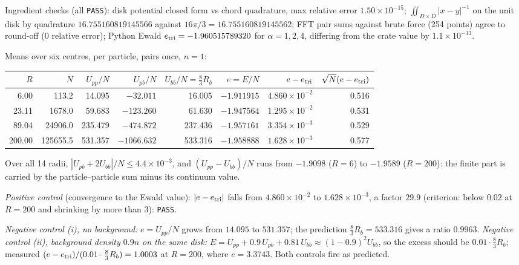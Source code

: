 \begin{numbox}[: three divergent terms, one finite sum ($s=1$, Tier X)]
Ingredient checks (all \texttt{PASS}): disk potential closed form vs chord quadrature, max relative error
$1.50\times10^{-15}$; $\iint_{D\times D}|x-y|^{-1}$ on the unit disk by quadrature $16.755160819145566$ against
$16\pi/3=16.755160819145562$; FFT pair sums against brute force (254 points) agree to round-off ($0$ relative error);
Python Ewald $e_{\rm tri}=-1.960515789320$ for $\alpha=1,2,4$, differing from the crate value by $1.1\times10^{-13}$.

Means over six centres, per particle, pairs once, $n=1$:
\begin{center}\footnotesize\setlength{\tabcolsep}{4pt}
\begin{tabular}{@{}rrrrrrrr@{}}
\toprule
$R$ & $N$ & $U_{pp}/N$ & $U_{pb}/N$ & $U_{bb}/N=\frac83R_b$ & $e=E/N$ & $e-e_{\rm tri}$ & $\sqrt N(e-e_{\rm tri})$\\
\midrule
6.00 & 113.2 & 14.095 & $-32.011$ & 16.005 & $-1.911915$ & $4.860\times10^{-2}$ & 0.516\\
23.11 & 1678.0 & 59.683 & $-123.260$ & 61.630 & $-1.947564$ & $1.295\times10^{-2}$ & 0.531\\
89.04 & 24906.0 & 235.479 & $-474.872$ & 237.436 & $-1.957161$ & $3.354\times10^{-3}$ & 0.529\\
200.00 & 125655.5 & 531.357 & $-1066.632$ & 533.316 & $-1.958888$ & $1.628\times10^{-3}$ & 0.577\\
\bottomrule
\end{tabular}
\end{center}
Over all 14 radii, $|U_{pb}+2U_{bb}|/N\le4.4\times10^{-3}$, and $(U_{pp}-U_{bb})/N$ runs from $-1.9098$ ($R=6$) to
$-1.9589$ ($R=200$): the finite part is carried by the particle--particle sum minus its continuum value.

\emph{Positive control} (convergence to the Ewald value): $|e-e_{\rm tri}|$ falls from $4.860\times10^{-2}$ to
$1.628\times10^{-3}$, a factor $29.9$ (criterion: below $0.02$ at $R=200$ and shrinking by more than $3$): \texttt{PASS}.

\emph{Negative control (i), no background:} $e=U_{pp}/N$ grows from $14.095$ to $531.357$; the prediction
$\frac83R_b=533.316$ gives a ratio $0.9963$. \emph{Negative control (ii), background density $0.9n$ on the same disk:}
$E=U_{pp}+0.9\,U_{pb}+0.81\,U_{bb}\approx(1-0.9)^2U_{bb}$, so the excess should be $0.01\cdot\frac83R_b$; measured
$(e-e_{\rm tri})/(0.01\cdot\frac83R_b)=1.0003$ at $R=200$, where $e=3.3743$. Both controls fire as predicted.


\end{numbox}
